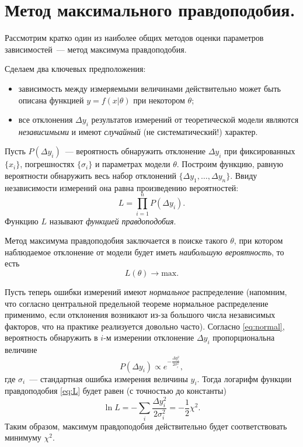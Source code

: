 \section{Метод максимального правдоподобия.} 
Рассмотрим кратко один
из наиболее общих методов оценки параметров зависимостей~---
метод максимума правдоподобия.

Сделаем два ключевых предположения:
\begin{itemize}
 \item  зависимость между измеряемыми величинами действительно может
 быть описана функцией $y=f(x|\theta)$ при некотором $\theta$;
 \item все отклонения $\Delta y_i$ результатов измерений от теоретической модели
 являются \emph{независимыми} и имеют \emph{случайный} (не систематический!) характер.
\end{itemize}

Пусть $P(\Delta y_i)$~--- вероятность обнаружить отклонение $\Delta y_i$
при фиксированных $\{x_i\}$, погрешностях $\{\sigma_i\}$ и параметрах модели $\theta$.
Построим функцию, равную вероятности обнаружить
весь набор отклонений $\{\Delta y_1,\ldots,\Delta y_n\}$. Ввиду независимости
измерений она равна произведению вероятностей:
\begin{equation}\label{eq:L}
L =  \prod_{i=1}^n P(\Delta y_i).
\end{equation}
Функцию $L$ называют \emph{функцией правдоподобия}.

Метод максимума правдоподобия заключается в поиске такого $\theta$,
при котором наблюдаемое отклонение от модели будет иметь
\emph{наибольшую вероятность}, то есть
\[
L(\theta) \to \mathrm{max}.
\]

Пусть теперь ошибки измерений имеют \emph{нормальное} распределение
(напомним, что согласно центральной предельной теореме нормальное распределение
применимо, если отклонения возникают из-за большого
числа независимых факторов, что на практике реализуется довольно часто).
Согласно \eqref{eq:normal}, вероятность обнаружить в $i$-м измерении
отклонение $\Delta y_i$ пропорциональна величине
\[
P(\Delta y_i) \propto e^{-\frac{\Delta y_i^2}{2\sigma_i^2}},
\]
где $\sigma_i$~--- стандартная ошибка измерения величины $y_i$. Тогда
логарифм функции правдоподобия \eqref{eq:L} будет равен (с точностью до константы)
\[
 \ln L = - \sum_i \frac{\Delta y_i^2}{2\sigma_i^2} = - \frac12 \chi^2.
\]
Таким образом, максимум правдоподобия действительно будет соответствовать
минимуму $\chi^2$.

